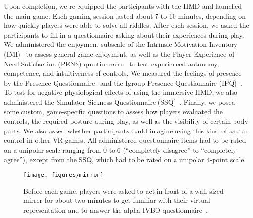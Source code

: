 \documentclass{sigchi}
\begin{document}
Upon completion, we re-equipped the participants with the HMD and launched the main game. Each gaming session lasted about 7 to 10 minutes, depending on how quickly players were able to solve all riddles. 
After each session, we asked the participants to fill in a questionnaire asking about their experiences during play. We administered the enjoyment subscale of the Intrinsic Motivation Inventory (IMI)~\cite{ryan2000self} to assess general game enjoyment, as well as the Player Experience of Need Satisfaction (PENS) questionnaire~\cite{Ryan.2006, Rigby.2007, Johnson.2010} to test experienced autonomy, competence, and intuitiveness of controls. We measured the feelings of presence by the Presence Questionnaire~\cite{Witmer.1998,Witmer.2005} and the Igroup Presence Questionnaire (IPQ)~\cite{Schubert.2003, Schubert.2018}. %
To test for negative physiological effects of using the immersive HMD, we also administered the Simulator Sickness Questionnaire (SSQ)~\cite{kennedy1993simulator}. Finally, we posed some custom, game-specific questions to assess how players evaluated the controls, the required posture during play, as well as the visibility of certain body parts. We also asked whether participants could imagine using this kind of avatar control in other VR games. All administered questionnaire items had to be rated on a unipolar scale ranging from 0 to 6 (``completely disagree'' to ``completely agree''), except from the SSQ, which had to be rated on a unipolar 4-point scale.



\begin{figure}[t!]
\centering
\texttt{[image: figures/mirror]}
\caption{
Before each game, players were asked to act in front of a wall-sized mirror for about two minutes to get familiar with their virtual representation and to answer the alpha IVBO questionnaire~\protect\cite{roth2017alpha}.}
\label{fig:mirror}
\end{figure}
\end{document}
